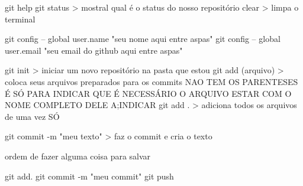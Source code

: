 
git help
git status > mostral qual é o status do nosso repositório
clear > limpa o terminal

git config -- global user.name "seu nome aqui entre aspas"
git config -- global user.email "seu email do github aqui entre aspas"

git init > iniciar um novo repositório na pasta que estou
git add (arquivo) > coloca seus arquivos preparados para os commits NAO TEM OS PARENTESES É SÓ PARA INDICAR QUE É NECESSÁRIO O ARQUIVO ESTAR COM O NOME COMPLETO DELE A;INDICAR
git add . > adiciona todos os arquivos de uma vez SÓ

git commit -m "meu texto" > faz o commit e cria  o texto


ordem de fazer alguma coisa para salvar

git add.
git commit -m  "meu  commit"
git push